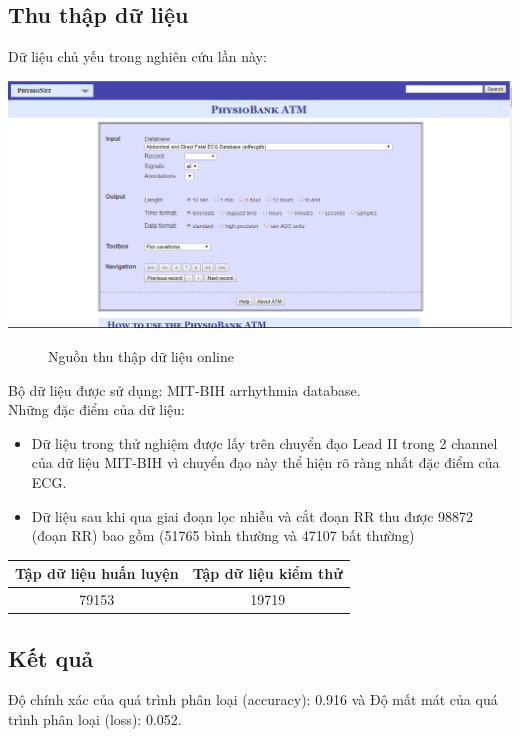 \subsection{Thu thập dữ liệu}
Dữ liệu chủ yếu trong nghiên cứu lần này:
\begin{center}
\includegraphics[scale=.3]{image/chapter5/physionet_bank.png}
\begin{figure}[htp]
\begin{center}
\end{center}
\caption{Nguồn thu thập dữ liệu online}
\end{figure}
\end{center}
Bộ dữ liệu được sử dụng: MIT-BIH arrhythmia database.\\
Những đặc điểm của dữ liệu:
\begin{itemize}
    \item Dữ liệu trong thử nghiệm được lấy trên chuyển đạo Lead II trong 2 channel của dữ liệu MIT-BIH vì chuyển đạo này thể hiện rõ ràng nhất đặc điểm của ECG.
    \item Dữ liệu sau khi qua giai đoạn lọc nhiễu và  cắt đoạn RR thu được 98872 (đoạn RR) bao gồm (51765 bình thường và 47107 bất thường)
\end{itemize}
\begin{center}
    \begin{tabular}{|c|c|}
    \hline 
    Tập dữ liệu huấn luyện & Tập dữ liệu kiểm thử \\ 
    \hline 
    79153 & 19719\\ 
    \hline 
    \end{tabular}
\end{center}

\subsection{Kết quả}
Độ chính xác của quá trình phân loại (accuracy): 0.916 và Độ mất mát của quá trình phân loại (loss): 0.052.
